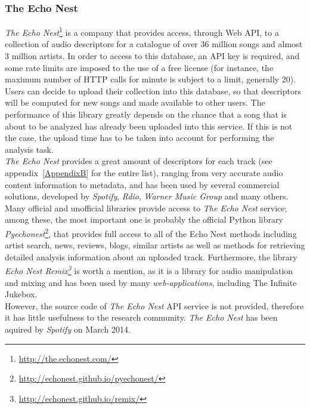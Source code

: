 \subsubsection*{The Echo Nest}

\textit{The Echo Nest}\footnote{\url{http://the.echonest.com/}} is a company that provides access, through Web API, to a collection of audio descriptors for a catalogue of over 36 million songs and almost 3 million artists. In order to access to this database, an API key is required, and some rate limits are imposed to the use of a free license (for instance, the maximum number of HTTP calls for minute is subject to a limit, generally 20). Users can decide to upload their collection into this database, so that descriptors will be computed for new songs and made available to other users. The performance of this library greatly depends on the chance that a song that is about to be analyzed has already been uploaded into this service. If this is not the case, the upload time has to be taken into account for performing the analysis task. \\ 
\textit{The Echo Nest} provides a great amount of descriptors for each track (see appendix~\ref{AppendixB} for the entire list), ranging from very accurate audio content information to metadata, and has been used by several commercial solutions, developed by \textit{Spotify}, \textit{Rdio}, \textit{Warner Music Group} and many others. Many official and unofficial libraries provide access to \textit{The Echo Nest} service; among these, the most important one is probably the official Python library \textit{Pyechonest}\footnote{\url{http://echonest.github.io/pyechonest/}}, that provides full access to all of the Echo Nest methods including artist search, news, reviews, blogs, similar artists as well as methods for retrieving detailed analysis information about an uploaded track. Furthermore, the library \textit{Echo Nest Remix\footnote{\url{http://echonest.github.io/remix/}}} is worth a mention, as it is a library for audio manipulation and mixing and has been used by many \textit{web-applications}, including The Infinite Jukebox. \\
However, the source code of \textit{The Echo Nest} API service is not provided, therefore it has little usefulness to the research community. \textit{The Echo Nest} has been aquired by \textit{Spotify} on March 2014.


